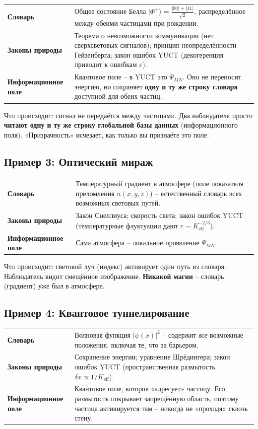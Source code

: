\documentclass[12pt,a4paper]{article}
\begin{document}
	\begin{tabular}{p{2.8cm} p{10cm}}
		\textbf{Словарь} & Общее состояние Белла \(|\Phi^+\rangle = \frac{|00\rangle + |11\rangle}{\sqrt{2}}\), распределённое между обеими частицами при рождении. \\
		\textbf{Законы природы} & Теорема о невозможности коммуникации (нет сверхсветовых сигналов); принцип неопределённости Гейзенберга; закон ошибок YUCT (декогеренция приводит к ошибкам \(\varepsilon\)). \\
		\textbf{Информационное поле} & Квантовое поле – в YUCT это \(\Psi_{MN}\). Оно не переносит энергию, но сохраняет \textbf{одну и ту же строку словаря} доступной для обеих частиц. \\
	\end{tabular}
	
	\noindent Что происходит: сигнал не передаётся между частицами. Два наблюдателя просто \textbf{читают одну и ту же строку глобальной базы данных} (информационного поля). «Призрачность» исчезает, как только вы признаёте это поле.
	
	\subsection{Пример 3: Оптический мираж}
	
	\begin{tabular}{p{2.8cm} p{10cm}}
		\textbf{Словарь} & Температурный градиент в атмосфере (поле показателя преломления \(n(x,y,z)\)) – естественный словарь всех возможных световых путей. \\
		\textbf{Законы природы} & Закон Снеллиуса; скорость света; закон ошибок YUCT (температурные флуктуации дают \(\varepsilon \sim K_{\mathrm{eff}}^{-2/3}\)). \\
		\textbf{Информационное поле} & Сама атмосфера – локальное проявление \(\Psi_{MN}\). \\
	\end{tabular}
	
	\noindent Что происходит: световой луч (индекс) активирует один путь из словаря. Наблюдатель видит смещённое изображение. \textbf{Никакой магии} – словарь (градиент) уже был в атмосфере.
	
	\subsection{Пример 4: Квантовое туннелирование}
	
	\begin{tabular}{p{2.8cm} p{10cm}}
		\textbf{Словарь} & Волновая функция \(|\psi(x)|^2\) – содержит \emph{все} возможные положения, включая те, что за барьером. \\
		\textbf{Законы природы} & Сохранение энергии; уравнение Шрёдингера; закон ошибок YUCT (пространственная размытость \(\delta x \propto 1/K_{\mathrm{eff}}\)). \\
		\textbf{Информационное поле} & Квантовое поле, которое «адресует» частицу. Его размытость покрывает запрещённую область, поэтому частица активируется там – никогда не «проходя» сквозь стену. \\
	\end{tabular}
	
\end{document}
